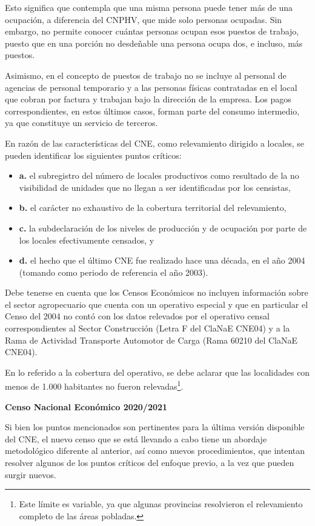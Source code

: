 \documentclass[
  openany]{book}
\providecommand{\tightlist}{%
  \setlength{\itemsep}{0pt}\setlength{\parskip}{0pt}}
\begin{document}
Esto significa que contempla que una misma persona puede tener más de una ocupación, a diferencia del CNPHV, que mide solo personas ocupadas. Sin embargo, no permite conocer cuántas personas ocupan esos puestos de trabajo, puesto que en una porción no desdeñable una persona ocupa dos, e incluso, más puestos.

Asimismo, en el concepto de puestos de trabajo no se incluye al personal de agencias de personal temporario y a las personas físicas contratadas en el local que cobran por factura y trabajan bajo la dirección de la empresa. Los pagos correspondientes, en estos últimos casos, forman parte del consumo intermedio, ya que constituye un servicio de terceros.

En razón de las características del CNE, como relevamiento dirigido a locales, se pueden identificar los siguientes puntos críticos:

\begin{itemize}
\tightlist
\item
  \textbf{a.} el subregistro del número de locales productivos como resultado de la no visibilidad de unidades que no llegan a ser identificadas por los censistas,
\item
  \textbf{b.} el carácter no exhaustivo de la cobertura territorial del relevamiento,
\item
  \textbf{c.} la subdeclaración de los niveles de producción y de ocupación por parte de los locales efectivamente censados, y
\item
  \textbf{d.} el hecho que el último CNE fue realizado hace una década, en el año 2004 (tomando como periodo de referencia el año 2003).
\end{itemize}

Debe tenerse en cuenta que los Censos Económicos no incluyen información sobre el sector agropecuario que cuenta con un operativo especial y que en particular el Censo del 2004 no contó con los datos relevados por el operativo censal correspondientes al Sector Construcción (Letra F del ClaNaE CNE04) y a la Rama de Actividad Transporte Automotor de Carga (Rama 60210 del ClaNaE CNE04).

En lo referido a la cobertura del operativo, se debe aclarar que las localidades con menos de 1.000 habitantes no fueron relevadas\footnote{Este límite es variable, ya que algunas provincias resolvieron el relevamiento completo de las áreas pobladas.}.

\textbf{Censo Nacional Económico 2020/2021}

Si bien los puntos mencionados son pertinentes para la última versión disponible del CNE, el nuevo censo que se está llevando a cabo tiene un abordaje metodológico diferente al anterior, así como nuevos procedimientos, que intentan resolver algunos de los puntos críticos del enfoque previo, a la vez que pueden surgir nuevos.
\end{document}
